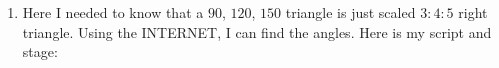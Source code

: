\documentclass[handout,noauthor,nooutcomes]{ximera}
\begin{document}
\begin{question}
\begin{freeResponse}
\begin{enumerate}
    \item Here I needed to know that a $90$, $120$, $150$ triangle is
      just scaled $3:4:5$ right triangle. Using the INTERNET, I can
      find the angles.  Here is my script and stage:
      \begin{center}
        \qquad
      \end{center}
    \end{enumerate}
  \end{freeResponse}
\end{question}
\end{document}
